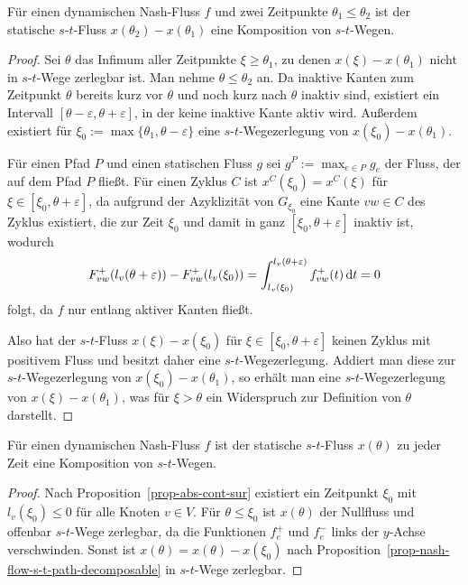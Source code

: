 \begin{proposition}\label{prop-nash-flow-s-t-path-decomposable}
	Für einen dynamischen Nash-Fluss $f$ und zwei Zeitpunkte $\theta_1 \leq \theta_2$ ist der statische $s$-$t$-Fluss $x(\theta_2) - x(\theta_1)$ eine Komposition von $s$-$t$-Wegen.
\end{proposition}
\begin{proof}
	Sei $\theta$ das Infimum aller Zeitpunkte $\xi\geq\theta_1$, zu denen $x(\xi) - x(\theta_1)$ nicht in $s$-$t$-Wege zerlegbar ist.
	Man nehme $\theta \leq \theta_2$ an.
	Da inaktive Kanten zum Zeitpunkt $\theta$ bereits kurz vor $\theta$ und noch kurz nach $\theta$ inaktiv sind, existiert ein Intervall $[\theta - \varepsilon, \theta + \varepsilon]$, in der keine inaktive Kante aktiv wird.
	Außerdem existiert für $\xi_0 := \max \{ \theta_1, \theta - \varepsilon \}$ eine $s$-$t$-Wegezerlegung von $x(\xi_0) - x(\theta_1)$.
	
	Für einen Pfad $P$ und einen statischen Fluss $g$ sei $g^P := \max_{e\in P} g_e$ der Fluss, der auf dem Pfad $P$ fließt.
	Für einen Zyklus $C$ ist $x^C(\xi_0) = x^C(\xi)$ für $\xi\in [\xi_0, \theta+\varepsilon]$, da aufgrund der Azyklizität von $G_{\xi_0}$ eine Kante $vw\in C$ des Zyklus existiert, die zur Zeit $\xi_0$ und damit in ganz $[\xi_0, \theta+\varepsilon]$ inaktiv ist, wodurch
	$$F_{vw}^+(l_v(\theta + \varepsilon)) - F_{vw}^+(l_v(\xi_0)) = \int_{l_v(\xi_0)}^{l_v(\theta + \varepsilon)} f_{vw}^+(t) \mathop{}\!\mathrm{d} t = 0$$
	folgt, da $f$ nur entlang aktiver Kanten fließt.
	
	Also hat der $s$-$t$-Fluss $x(\xi) - x(\xi_0)$ für $\xi\in [\xi_0, \theta + \varepsilon]$ keinen Zyklus mit positivem Fluss und besitzt daher eine $s$-$t$-Wegezerlegung.
	Addiert man diese zur $s$-$t$-Wegezerlegung von $x(\xi_0) - x(\theta_1)$, so erhält man eine $s$-$t$-Wegezerlegung von $x(\xi) - x(\theta_1)$, was für $\xi > \theta$ ein Widerspruch zur Definition von $\theta$ darstellt.
\end{proof}

\begin{corollary}
	Für einen dynamischen Nash-Fluss $f$ ist der statische $s$-$t$-Fluss $x(\theta)$ zu jeder Zeit eine Komposition von $s$-$t$-Wegen.
\end{corollary}
\begin{proof}
	Nach Proposition~\ref{prop-abs-cont-sur} existiert ein Zeitpunkt $\xi_0$ mit $l_v(\xi_0) \leq 0$ für alle Knoten $v\in V$.
	Für $\theta \leq \xi_0$ ist $x(\theta)$ der Nullfluss und offenbar $s$-$t$-Wege zerlegbar, da die Funktionen $f_e^+$ und $f_e^-$ links der $y$-Achse verschwinden.
	Sonst ist $x(\theta)=  x(\theta) - x(\xi_0)$ nach Proposition~\ref{prop-nash-flow-s-t-path-decomposable} in $s$-$t$-Wege zerlegbar.
\end{proof}